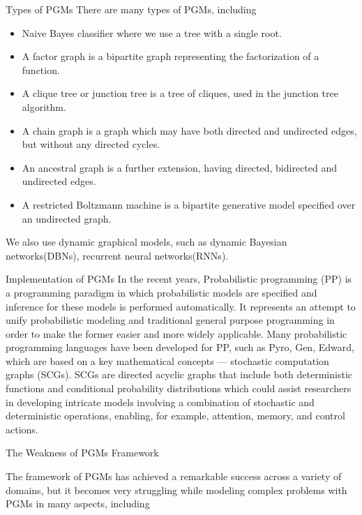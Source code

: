 \documentclass[10pt]{beamer}
\begin{document}
\begin{CJK*}{UTF8}{gbsn}
\begin{frame}{Types of PGMs}
    There are many types of PGMs, including
    \begin{itemize}
        \item Naive Bayes classifier where we use a tree with a single root.
        \item A factor graph is a bipartite graph representing the factorization of a function. 
        \item A clique tree or junction tree is a tree of cliques, used in the junction tree algorithm.
        \item A chain graph is a graph which may have both directed and undirected edges, but without any directed cycles.
        \item An ancestral graph is a further extension, having directed, bidirected and undirected edges.
        \item A restricted Boltzmann machine is a bipartite generative model specified over an undirected graph.
    \end{itemize}
    We also use dynamic graphical models, such as dynamic Bayesian networks(DBNs), recurrent neural networks(RNNs). 
\end{frame}

\begin{frame}{Implementation of PGMs}
    In the recent years, Probabilistic programming (PP) is a programming paradigm in which probabilistic models are specified and inference for these models is performed automatically. It represents an attempt to unify probabilistic modeling and traditional general purpose programming in order to make the former easier and more widely applicable. Many probabilistic programming languages have been developed for PP, such as Pyro, Gen, Edward, which are based on a key mathematical concepts --- stochastic computation graphs (SCGs). SCGs are directed acyclic graphs that include both deterministic functions and conditional probability distributions which could assist researchers in developing intricate models involving a combination of stochastic and deterministic operations, enabling, for example, attention, memory, and control actions.  
\end{frame}


\begin{frame}{The Weakness of PGMs Framework}
    
    The framework of PGMs has achieved a remarkable success across a variety of domains, but it becomes very struggling while modeling complex problems with PGMs in many aspects, including
    

\end{frame}
\end{CJK*}
\end{document}
